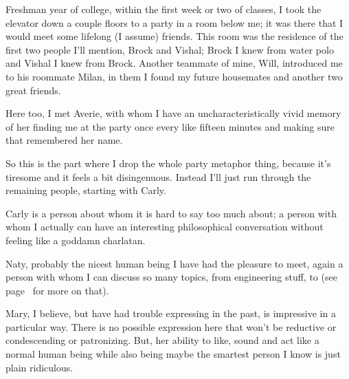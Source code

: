\documentclass[./butidigress.tex]{subfiles}
\begin{document}
Freshman year of college, within the first week or two of classes, I took the elevator down a couple floors to a party in a room below me; it was there that I would meet some lifelong (I assume) friends.
This room was the residence of the first two people I'll mention, Brock and Vishal; Brock I knew from water polo and Vishal I knew from Brock.
Another teammate of mine, Will, introduced me to his roommate Milan, in them I found my future housemates and another two great friends.

\entryskip


Here too, I met Averie, with whom I have an uncharacteristically vivid memory of her finding me at the party once every like fifteen minutes and making sure that remembered her name.

So this is the part where I drop the whole party metaphor thing, because it's tiresome and it feels a bit disingenuous.
Instead I'll just run through the remaining people, starting with Carly.

Carly is a person about whom it is hard to say too much about; a person with whom I actually can have an interesting philosophical conversation without feeling like a goddamn charlatan.

Naty, probably the nicest human being I have had the pleasure to meet, again a person with whom I can discuss so many topics, from engineering stuff, to  (see page~\pageref{chap:sincerity} for more on that).

Mary, I believe, but have had trouble expressing in the past, is impressive in a particular way.
There is no possible expression here that won't be reductive or condescending or patronizing.
But, her ability to like, sound and act like a normal human being while also being maybe the smartest person I know is just plain ridiculous.
\end{document}
